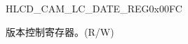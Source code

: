 \begin{register}{H}{LCD\_CAM\_LC\_DATE\_REG}{0x{}00FC}\label{regdesc:LCDCAMLCREGDATEREG}
%
%
\regnewline%
\begin{regdesc}\begin{reglist}
\label{fielddesc:LCDCAMLCDATE}\item [LCD\_CAM\_LC\_DATE] 版本控制寄存器。(R/W)
\end{reglist}\end{regdesc}
\end{register}


